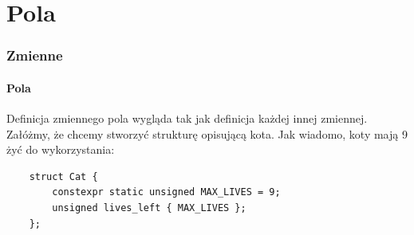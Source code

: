 \documentclass[aspectratio=169,10pt]{beamer}
\begin{document}












\section{Pola}

\begin{frame}[fragile]
    \frametitle{Zmienne}
    \framesubtitle{Pola}

    Definicja zmiennego pola wygląda tak jak definicja każdej innej zmiennej.
    Załóżmy, że chcemy stworzyć strukturę opisującą kota. Jak wiadomo, koty mają
    9 żyć do wykorzystania:

    {\small
    \begin{lstlisting}
    struct Cat {
        constexpr static unsigned MAX_LIVES = 9;
        unsigned lives_left { MAX_LIVES };
    };
    \end{lstlisting}}
\end{frame}
\end{document}
